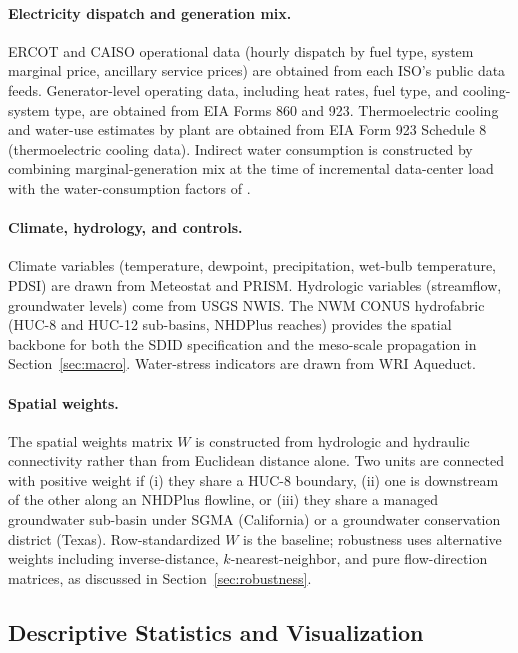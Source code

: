 \documentclass[11pt, letterpaper]{article}
\begin{document}
\paragraph{Electricity dispatch and generation mix.} ERCOT and CAISO operational data (hourly dispatch by fuel type, system marginal price, ancillary service prices) are obtained from each ISO's public data feeds. Generator-level operating data, including heat rates, fuel type, and cooling-system type, are obtained from EIA Forms 860 and 923. Thermoelectric cooling and water-use estimates by plant are obtained from EIA Form 923 Schedule 8 (thermoelectric cooling data). Indirect water consumption is constructed by combining marginal-generation mix at the time of incremental data-center load with the water-consumption factors of \citet{jin2019water}.

\paragraph{Climate, hydrology, and controls.} Climate variables (temperature, dewpoint, precipitation, wet-bulb temperature, PDSI) are drawn from Meteostat and PRISM. Hydrologic variables (streamflow, groundwater levels) come from USGS NWIS. The NWM CONUS hydrofabric (HUC-8 and HUC-12 sub-basins, NHDPlus reaches) provides the spatial backbone for both the SDID specification and the meso-scale propagation in Section~\ref{sec:macro}. Water-stress indicators are drawn from WRI Aqueduct.

\paragraph{Spatial weights.} The spatial weights matrix $W$ is constructed from hydrologic and hydraulic connectivity rather than from Euclidean distance alone. Two units are connected with positive weight if (i) they share a HUC-8 boundary, (ii) one is downstream of the other along an NHDPlus flowline, or (iii) they share a managed groundwater sub-basin under SGMA (California) or a groundwater conservation district (Texas). Row-standardized $W$ is the baseline; robustness uses alternative weights including inverse-distance, $k$-nearest-neighbor, and pure flow-direction matrices, as discussed in Section~\ref{sec:robustness}.

\subsection{Descriptive Statistics and Visualization}
\label{sec:descstats}
\end{document}

